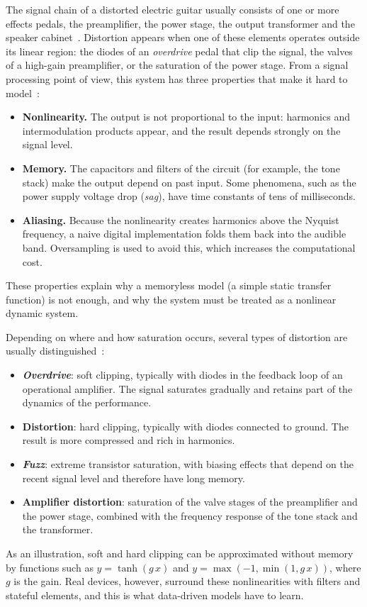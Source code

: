 \documentclass[ENG]{TFUOC}%
\begin{document}
The signal chain of a distorted electric guitar usually consists of one or more effects pedals, the preamplifier, the power stage, the output transformer and the speaker cabinet~\cite{pakarinen2009}. Distortion appears when one of these elements operates outside its linear region: the diodes of an \emph{overdrive} pedal that clip the signal, the valves of a high-gain preamplifier, or the saturation of the power stage. From a signal processing point of view, this system has three properties that make it hard to model~\cite{pakarinen2009,yeh2009}:
\begin{itemize}[nosep]
    \item \textbf{Nonlinearity.} The output is not proportional to the input: harmonics and intermodulation products appear, and the result depends strongly on the signal level.
    \item \textbf{Memory.} The capacitors and filters of the circuit (for example, the tone stack) make the output depend on past input. Some phenomena, such as the power supply voltage drop (\emph{sag}), have time constants of tens of milliseconds.
    \item \textbf{Aliasing.} Because the nonlinearity creates harmonics above the Nyquist frequency, a naive digital implementation folds them back into the audible band. Oversampling is used to avoid this, which increases the computational cost.
\end{itemize}
These properties explain why a memoryless model (a simple static transfer function) is not enough, and why the system must be treated as a nonlinear dynamic system.

Depending on where and how saturation occurs, several types of distortion are usually distinguished~\cite{pakarinen2009,yeh2009}:
\begin{itemize}[nosep]
    \item \textbf{\emph{Overdrive}}: soft clipping, typically with diodes in the feedback loop of an operational amplifier. The signal saturates gradually and retains part of the dynamics of the performance.
    \item \textbf{Distortion}: hard clipping, typically with diodes connected to ground. The result is more compressed and rich in harmonics.
    \item \textbf{\emph{Fuzz}}: extreme transistor saturation, with biasing effects that depend on the recent signal level and therefore have long memory.
    \item \textbf{Amplifier distortion}: saturation of the valve stages of the preamplifier and the power stage, combined with the frequency response of the tone stack and the transformer.
\end{itemize}
As an illustration, soft and hard clipping can be approximated without memory by functions such as $y=\tanh(g\,x)$ and $y=\max(-1,\min(1,g\,x))$, where $g$ is the gain. Real devices, however, surround these nonlinearities with filters and stateful elements, and this is what data-driven models have to learn.
\end{document}
